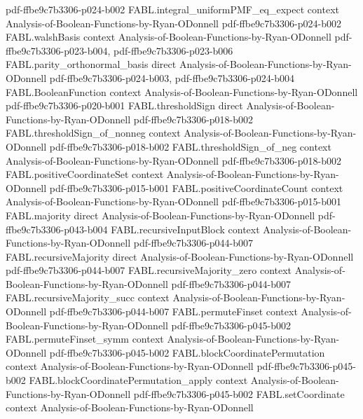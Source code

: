 \begin{theorem}
  {pdf-ffbe9c7b3306-p024-b002}
\proofstep
  {FABL.integral_uniformPMF_eq_expect}
  {context}
  {Analysis-of-Boolean-Functions-by-Ryan-ODonnell}
  {pdf-ffbe9c7b3306-p024-b002}
\proofstep
  {FABL.walshBasis}
  {context}
  {Analysis-of-Boolean-Functions-by-Ryan-ODonnell}
  {pdf-ffbe9c7b3306-p023-b004,
    pdf-ffbe9c7b3306-p023-b006}
\proofstep
  {FABL.parity_orthonormal_basis}
  {direct}
  {Analysis-of-Boolean-Functions-by-Ryan-ODonnell}
  {pdf-ffbe9c7b3306-p024-b003,
    pdf-ffbe9c7b3306-p024-b004}
\proofstep
  {FABL.BooleanFunction}
  {context}
  {Analysis-of-Boolean-Functions-by-Ryan-ODonnell}
  {pdf-ffbe9c7b3306-p020-b001}
\proofstep
  {FABL.thresholdSign}
  {direct}
  {Analysis-of-Boolean-Functions-by-Ryan-ODonnell}
  {pdf-ffbe9c7b3306-p018-b002}
\proofstep
  {FABL.thresholdSign_of_nonneg}
  {context}
  {Analysis-of-Boolean-Functions-by-Ryan-ODonnell}
  {pdf-ffbe9c7b3306-p018-b002}
\proofstep
  {FABL.thresholdSign_of_neg}
  {context}
  {Analysis-of-Boolean-Functions-by-Ryan-ODonnell}
  {pdf-ffbe9c7b3306-p018-b002}
\proofstep
  {FABL.positiveCoordinateSet}
  {context}
  {Analysis-of-Boolean-Functions-by-Ryan-ODonnell}
  {pdf-ffbe9c7b3306-p015-b001}
\proofstep
  {FABL.positiveCoordinateCount}
  {context}
  {Analysis-of-Boolean-Functions-by-Ryan-ODonnell}
  {pdf-ffbe9c7b3306-p015-b001}
\proofstep
  {FABL.majority}
  {direct}
  {Analysis-of-Boolean-Functions-by-Ryan-ODonnell}
  {pdf-ffbe9c7b3306-p043-b004}
\proofstep
  {FABL.recursiveInputBlock}
  {context}
  {Analysis-of-Boolean-Functions-by-Ryan-ODonnell}
  {pdf-ffbe9c7b3306-p044-b007}
\proofstep
  {FABL.recursiveMajority}
  {direct}
  {Analysis-of-Boolean-Functions-by-Ryan-ODonnell}
  {pdf-ffbe9c7b3306-p044-b007}
\proofstep
  {FABL.recursiveMajority_zero}
  {context}
  {Analysis-of-Boolean-Functions-by-Ryan-ODonnell}
  {pdf-ffbe9c7b3306-p044-b007}
\proofstep
  {FABL.recursiveMajority_succ}
  {context}
  {Analysis-of-Boolean-Functions-by-Ryan-ODonnell}
  {pdf-ffbe9c7b3306-p044-b007}
\proofstep
  {FABL.permuteFinset}
  {context}
  {Analysis-of-Boolean-Functions-by-Ryan-ODonnell}
  {pdf-ffbe9c7b3306-p045-b002}
\proofstep
  {FABL.permuteFinset_symm}
  {context}
  {Analysis-of-Boolean-Functions-by-Ryan-ODonnell}
  {pdf-ffbe9c7b3306-p045-b002}
\proofstep
  {FABL.blockCoordinatePermutation}
  {context}
  {Analysis-of-Boolean-Functions-by-Ryan-ODonnell}
  {pdf-ffbe9c7b3306-p045-b002}
\proofstep
  {FABL.blockCoordinatePermutation_apply}
  {context}
  {Analysis-of-Boolean-Functions-by-Ryan-ODonnell}
  {pdf-ffbe9c7b3306-p045-b002}
\proofstep
  {FABL.setCoordinate}
  {context}
  {Analysis-of-Boolean-Functions-by-Ryan-ODonnell}

\end{theorem}

